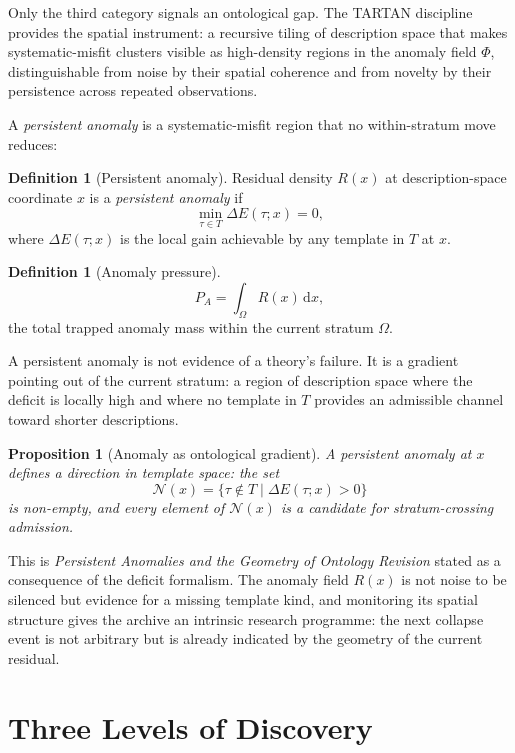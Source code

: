 \documentclass[11pt, a4paper, openany]{book}
\theoremstyle{plain}
\newtheorem{proposition}[theorem]{Proposition}
\theoremstyle{definition}
\newtheorem{definition}[theorem]{Definition}
\theoremstyle{remark}
\begin{document}
Only the third category signals an ontological gap.
The TARTAN discipline \cite{flyxion2026waves} provides the spatial instrument:
a recursive tiling of description space that makes systematic-misfit clusters
visible as high-density regions in the anomaly field $\Phi$,
distinguishable from noise by their spatial coherence and from novelty
by their persistence across repeated observations.

A \emph{persistent anomaly} is a systematic-misfit region that no within-stratum
move reduces:
\begin{definition}[Persistent anomaly]
  Residual density $R(x)$ at description-space coordinate $x$ is a
  \emph{persistent anomaly} if
  \[
    \min_{\tau \in T} \Delta E(\tau; x) = 0,
  \]
  where $\Delta E(\tau; x)$ is the local gain achievable by any template
  in $T$ at $x$.
\end{definition}

\begin{definition}[Anomaly pressure]
  \[
    P_A = \int_\Omega R(x)\,\mathrm{d}x,
  \]
  the total trapped anomaly mass within the current stratum $\Omega$.
\end{definition}

A persistent anomaly is not evidence of a theory's failure.
It is a gradient pointing out of the current stratum: a region of description
space where the deficit is locally high and where no template in $T$ provides
an admissible channel toward shorter descriptions.

\begin{proposition}[Anomaly as ontological gradient]
  \label{prop:gradient}
  A persistent anomaly at $x$ defines a direction in template space:
  the set
  \[
    \mathcal{N}(x) = \bigl\{\tau \notin T
    \;\big|\; \Delta E(\tau; x) > 0 \bigr\}
  \]
  is non-empty, and every element of $\mathcal{N}(x)$ is a candidate
  for stratum-crossing admission.
\end{proposition}

This is \emph{Persistent Anomalies and the Geometry of Ontology Revision}
stated as a consequence of the deficit formalism.
The anomaly field $R(x)$ is not noise to be silenced but evidence for a
missing template kind, and monitoring its spatial structure gives the archive
an intrinsic research programme: the next collapse event is not arbitrary
but is already indicated by the geometry of the current residual.

\section{Three Levels of Discovery}
\end{document}

